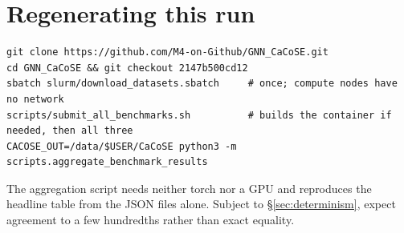 \documentclass[11pt,a4paper]{article}
\begin{document}
\section{Regenerating this run}

\begin{verbatim}
git clone https://github.com/M4-on-Github/GNN_CaCoSE.git
cd GNN_CaCoSE && git checkout 2147b500cd12
sbatch slurm/download_datasets.sbatch     # once; compute nodes have no network
scripts/submit_all_benchmarks.sh          # builds the container if needed, then all three
CACOSE_OUT=/data/$USER/CaCoSE python3 -m scripts.aggregate_benchmark_results
\end{verbatim}

The aggregation script needs neither torch nor a GPU and reproduces the headline table from the
JSON files alone. Subject to \S\ref{sec:determinism}, expect agreement to a few hundredths rather
than exact equality.
\end{document}
